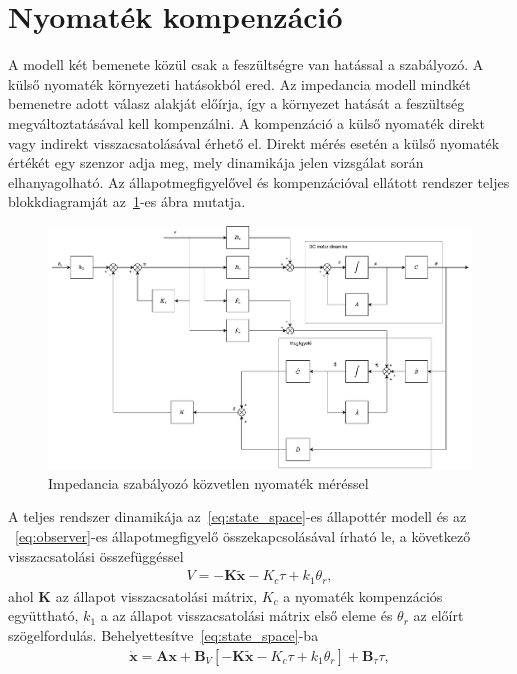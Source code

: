 \section{Nyomaték kompenzáció}
A modell két bemenete közül csak a feszültségre van hatással a 
szabályozó. A külső nyomaték környezeti hatásokból ered. Az impedancia 
modell mindkét bemenetre adott válasz alakját előírja, így a környezet 
hatását a feszültség megváltoztatásával kell kompenzálni. A kompenzáció
a külső nyomaték direkt vagy indirekt visszacsatolásával érhető el.
Direkt mérés esetén a külső nyomaték értékét egy szenzor adja meg, 
mely dinamikája jelen vizsgálat során elhanyagolható. Az
állapotmegfigyelővel és kompenzációval ellátott rendszer teljes 
blokkdiagramját az~\ref{fig:block_diagram_direct_compensation}-es ábra mutatja.
\begin{figure}[ht]
    \begin{center}
    \includegraphics[width=\textwidth]{images/compensated_position_control_torque.drawio.pdf}
    \caption{Impedancia szabályozó közvetlen nyomaték méréssel}\label{fig:block_diagram_direct_compensation}
    \end{center}
\end{figure}
A teljes rendszer dinamikája az~\eqref{eq:state_space}-es állapottér modell és az ~\eqref{eq:observer}-es 
állapotmegfigyelő összekapcsolásával írható le, a következő visszacsatolási összefüggéssel
\begin{align}
    V = -\bm K \tilde{\bm x} -K_c \tau + k_1 \theta_r,
\end{align}
ahol $\bm K$ az állapot visszacsatolási mátrix, $K_c$ a nyomaték kompenzációs együttható,
$k_1$ a az állapot visszacsatolási mátrix első eleme és $\theta_r$ az előírt szögelfordulás.
Behelyettesítve~\eqref{eq:state_space}-ba
\begin{align}\label{eq:state_control_law_subs}
    \dot{\bm x} = \bm A \bm x + \bm B_V\left[-\bm K \tilde{\bm x} -K_c \tau + k_1 \theta_r\right] + \bm B_\tau \tau,
\end{align}
